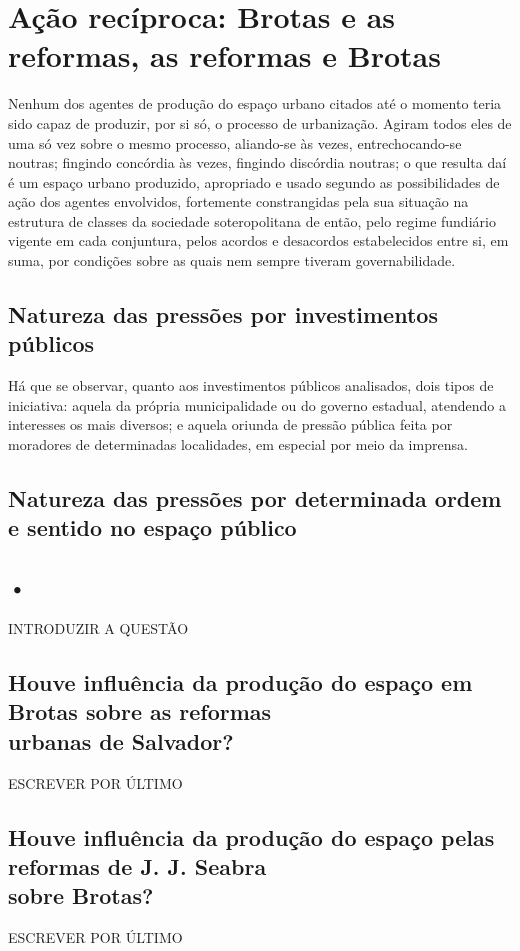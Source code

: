 \section{Ação recíproca: Brotas e as reformas, as reformas e Brotas}\label{sec:3.3}

Nenhum dos agentes de produção do espaço urbano citados até o momento teria sido capaz de produzir, por si só, o processo de urbanização. Agiram todos eles de uma só vez sobre o mesmo processo, aliando-se às vezes, entrechocando-se noutras; fingindo concórdia às vezes, fingindo discórdia noutras; o que resulta daí é um espaço urbano produzido, apropriado e usado segundo as possibilidades de ação dos agentes envolvidos, fortemente constrangidas pela sua situação na estrutura de classes da sociedade soteropolitana de então, pelo regime fundiário vigente em cada conjuntura, pelos acordos e desacordos estabelecidos entre si, em suma, por condições sobre as quais nem sempre tiveram governabilidade.



\subsection{Natureza das pressões por investimentos públicos}

Há que se observar, quanto aos investimentos públicos analisados, dois tipos de iniciativa: aquela da própria municipalidade ou do governo estadual, atendendo a interesses os mais diversos; e aquela oriunda de pressão pública feita por moradores de determinadas localidades, em especial por meio da imprensa.

\subsection{Natureza das pressões por determinada ordem e sentido no espaço público}



\subsection{•}

INTRODUZIR A QUESTÃO

\subsection[Houve influência da produção do espaço em Brotas sobre as reformas\\ urbanas de Salvador?]{Houve influência da produção do espaço em Brotas sobre as reformas\\ urbanas de Salvador?}\label{subsec:3.3.1}

ESCREVER POR ÚLTIMO

\subsection[Houve influência da produção do espaço pelas reformas de J. J. Seabra\\sobre Brotas?]{Houve influência da produção do espaço pelas reformas de J. J. Seabra\\ sobre Brotas?}\label{subsec:3.3.2}

ESCREVER POR ÚLTIMO